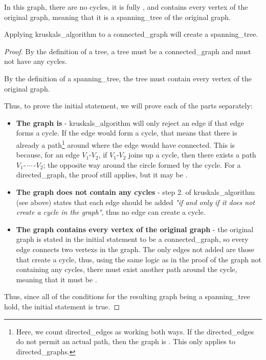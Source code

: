             In this \gls{graph}, there are no \glspl{cycle}, it is fully , and contains every \gls{vertex} of the original \gls{graph}, meaning that it is a \gls{spanning_tree} of the original \gls{graph}.
            \begin{theorem} \label{thm:kruskal_creates_spanning_tree}
                Applying \gls{kruskals_algorithm} to a  \gls{connected_graph} will create a \gls{spanning_tree}.
            \end{theorem}
            \begin{proof}
                By the definition of a \gls{tree}, a \gls{tree} must be a \gls{connected_graph} and must not have any \glspl{cycle}.

                By the definition of a \gls{spanning_tree}, the \gls{tree} must contain every \gls{vertex} of the original \gls{graph}.

                Thus, to prove the initial statement, we will prove each of the parts separately:
                \begin{itemize}
                    \item \textbf{The \gls{graph} is } - \gls{kruskals_algorithm} will only reject an \gls{edge} if that \gls{edge} forms a \gls{cycle}.
                    If the \gls{edge} would form a \gls{cycle}, that means that there is already a \gls{path}\footnote{Here, we count \glspl{directed_edge} as working both ways. If the \glspl{directed_edge} do not permit an actual \gls{path}, then the \gls{graph} is . This only applies to \glspl{directed_graph}.} around where the \gls{edge} would have connected.
                    This is because, for an \gls{edge} $V_1$-$V_2$, if $V_1$-$V_2$ joins up a \gls{cycle}, then there exists a \gls{path} $V_1$-$\,\cdots\,$-$V_2$; the opposite way around the circle formed by the \gls{cycle}.
                    For a \gls{directed_graph}, the proof still applies, but it may be .
                    \item \textbf{The \gls{graph} does not contain any \glspl{cycle}} - step 2. of \gls{kruskals_algorithm} (see above) states that each \gls{edge} should be added \textit{"if and only if it does not create a \gls{cycle} in the \gls{graph}"}, thus no \gls{edge} can create a \gls{cycle}.
                    \item \textbf{The \gls{graph} contains every \gls{vertex} of the original \gls{graph}} - the original \gls{graph} is stated in the initial statement to be a \gls{connected_graph}, so every \gls{edge} connects two \glspl{vertex} in the \gls{graph}.
                    The only \glspl{edge} not added are those that create a \gls{cycle}, thus, using the same logic as in the proof of the \gls{graph} not containing any \glspl{cycle}, there must exist another \gls{path} around the \gls{cycle}, meaning that it must be .
                \end{itemize}
                Thus, since all of the conditions for the resulting \gls{graph} being a \gls{spanning_tree} hold, the initial statement is true.
            \end{proof}
